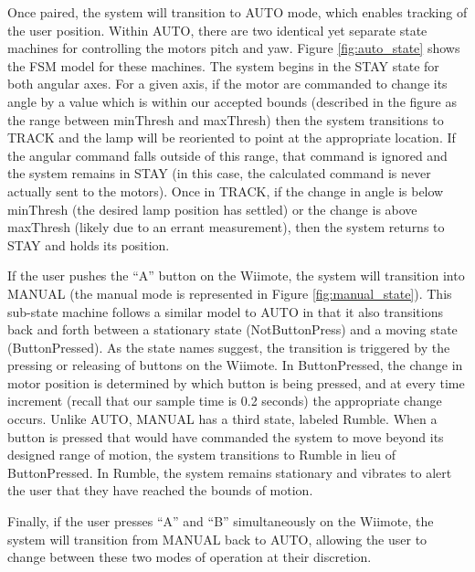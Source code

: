 \documentclass[conference, twocolumn]{IEEEtran}
\begin{document}
 Once paired, the system will transition to AUTO mode, which enables tracking of the user position. Within AUTO, there are two identical yet separate state machines for controlling the motors pitch and yaw. Figure \ref{fig:auto_state} shows the FSM model for these machines. The system begins in the STAY state for both angular axes. For a given axis, if the motor are commanded to change its angle by a value which is within our accepted bounds (described in the figure as the range between minThresh and maxThresh) then the system transitions to TRACK and the lamp will be reoriented to point at the appropriate location. If the angular command falls outside of this range, that command is ignored and the system remains in STAY (in this case, the calculated command is never actually sent to the motors). Once in TRACK, if the change in angle is below minThresh (the desired lamp position has settled) or the change is above maxThresh (likely due to an errant measurement), then the system returns to STAY and holds its position.
 
If the user pushes the ``A'' button on the Wiimote, the system will transition into MANUAL (the manual mode is represented in Figure \ref{fig:manual_state}). This sub-state machine follows a similar model to AUTO in that it also transitions back and forth between a stationary state (NotButtonPress) and a moving state (ButtonPressed). As the state names suggest, the transition is triggered by the pressing or releasing of buttons on the Wiimote. In ButtonPressed, the change in motor position is determined by which button is being pressed, and at every time increment (recall that our sample time is 0.2 seconds) the appropriate change occurs. Unlike AUTO, MANUAL has a third state, labeled Rumble. When a button is pressed that would have commanded the system to move beyond its designed range of motion, the system transitions to Rumble in lieu of ButtonPressed. In Rumble, the system remains stationary and vibrates to alert the user that they have reached the bounds of motion.

Finally, if the user presses ``A'' and ``B'' simultaneously on the Wiimote, the system will transition from MANUAL back to AUTO, allowing the user to change between these two modes of operation at their discretion.
\end{document}
